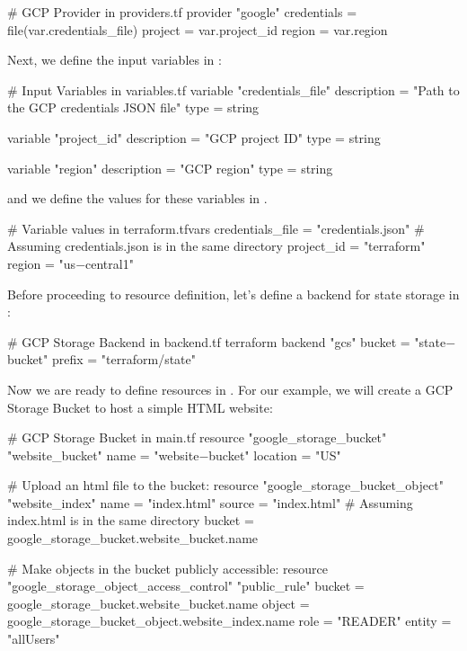 \begin{block}
# GCP Provider in providers.tf
provider "google" {
    credentials = file(var.credentials_file)
    project = var.project_id
    region = var.region
}
\end{block}

Next, we define the input variables in :

\begin{block}
# Input Variables in variables.tf
variable "credentials_file" {
    description = "Path to the GCP credentials JSON file"
    type = string
}

variable "project_id" {
    description = "GCP project ID"
    type = string
}

variable "region" {
    description = "GCP region"
    type = string
}
\end{block}

and we define the values for these variables in .

\begin{block}
# Variable values in terraform.tfvars
credentials_file = "credentials.json" # Assuming credentials.json is in the same directory
project_id = "terraform"
region = "us$-$central1"
\end{block}

Before proceeding to resource definition, let's define a backend for state storage in :

\begin{block}
# GCP Storage Backend in backend.tf
terraform {
    backend "gcs" {
        bucket = "state$-$bucket"
        prefix = "terraform/state"
    }
}
\end{block}

Now we are ready to define resources in . For our example, we will create a GCP Storage Bucket to host
a simple HTML website:

\begin{block}
# GCP Storage Bucket in main.tf
resource "google_storage_bucket" "website_bucket" {
    name = "website$-$bucket"
    location = "US"
}

# Upload an html file to the bucket:
resource "google_storage_bucket_object" "website_index" {
    name = "index.html"
    source = "index.html" # Assuming index.html is in the same directory
    bucket = google_storage_bucket.website_bucket.name
}

# Make objects in the bucket publicly accessible:
resource "google_storage_object_access_control" "public_rule" {
    bucket = google_storage_bucket.website_bucket.name
    object = google_storage_bucket_object.website_index.name
    role = "READER"
    entity = "allUsers"
}
\end{block}

